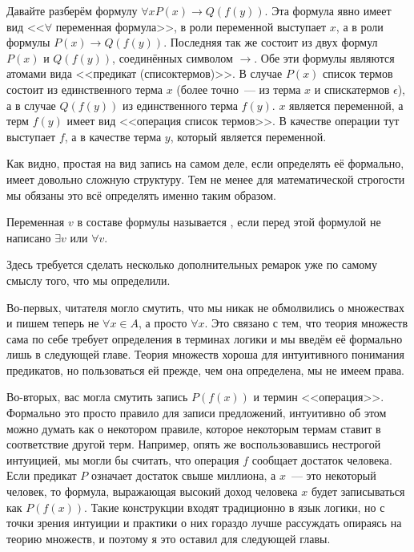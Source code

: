 \begin{example}
Давайте разберём формулу $\forall x P(x) \to Q(f(y))$. Эта формула явно имеет вид <<$\forall$ переменная формула>>, в роли переменной выступает $x$, а в роли формулы $P(x) \to Q(f(y))$. Последняя так же состоит из двух формул $P(x)$ и $Q(f(y))$, соединённых символом $\to$. Обе эти формулы являются атомами вида <<предикат (списоктермов)>>. В случае $P(x)$ список термов состоит из единственного терма $x$ (более точно~--- из терма $x$ и спискатермов $\epsilon$), а в случае $Q(f(y))$ из единственного терма $f(y)$. $x$ является переменной, а терм $f(y)$ имеет вид <<операция список термов>>. В качестве операции тут выступает $f$, а в качестве терма $y$, который является переменной.
\end{example}

Как видно, простая на вид запись на самом деле, если определять её формально, имеет довольно сложную структуру. Тем не менее для математической строгости мы обязаны это всё определять именно таким образом.

\begin{definition}
Переменная $v$ в составе формулы называется , если перед этой формулой не написано $\exists v$ или $\forall v$.
\end{definition}

Здесь требуется сделать несколько дополнительных ремарок уже по самому смыслу того, что мы определили.

Во-первых, читателя могло смутить, что мы никак не обмолвились о множествах и пишем теперь не $\forall x\in A$, а просто $\forall x$. Это связано с тем, что теория множеств сама по себе требует определения в терминах логики и мы введём её формально лишь в следующей главе. Теория множеств хороша для интуитивного понимания предикатов, но пользоваться ей прежде, чем она определена, мы не имеем права.

Во-вторых, вас могла смутить запись $P(f(x))$ и термин <<операция>>. Формально это просто правило для записи предложений, интуитивно об этом можно думать как о некотором правиле, которое некоторым термам ставит в соответствие другой терм. Например, опять же воспользовавшись нестрогой интуицией, мы могли бы считать, что операция $f$ сообщает достаток человека. Если предикат $P$ означает достаток свыше миллиона, а $x$~--- это некоторый человек, то формула, выражающая высокий доход человека $x$ будет записываться как $P(f(x))$. Такие конструкции входят традиционно в язык логики, но с точки зрения интуиции и практики о них гораздо лучше рассуждать опираясь на теорию множеств, и поэтому я это оставил для следующей главы.


